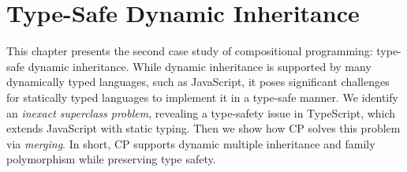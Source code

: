 \chapter{Type-Safe Dynamic Inheritance} \label{ch:inheritance}

This chapter presents the second case study of compositional programming:
type-safe dynamic inheritance. While dynamic inheritance is supported by many
dynamically typed languages, such as JavaScript, it poses significant challenges
for statically typed languages to implement it in a type-safe manner. We
identify an \emph{inexact superclass problem}, revealing a type-safety issue in
TypeScript, which extends JavaScript with static typing. Then we show how CP
solves this problem via \emph{merging}. In short, CP supports dynamic multiple
inheritance and family polymorphism while preserving type safety.




